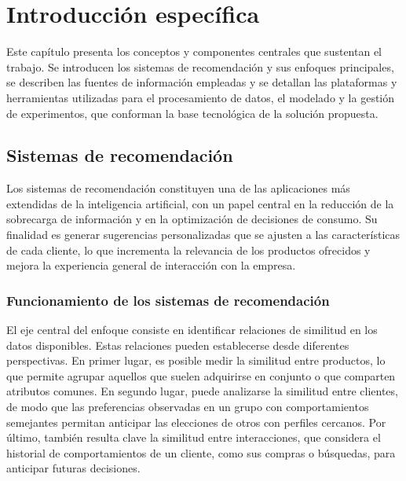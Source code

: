 \chapter{Introducción específica} 

\label{Chapter2}

Este capítulo presenta los conceptos y componentes centrales que sustentan el trabajo. Se introducen los sistemas de recomendación y sus enfoques principales, se describen las fuentes de información empleadas y se detallan las plataformas y herramientas utilizadas para el procesamiento de datos, el modelado y la gestión de experimentos, que conforman la base tecnológica de la solución propuesta.

\section{Sistemas de recomendación}

Los sistemas de recomendación constituyen una de las aplicaciones más extendidas de la inteligencia artificial, con un papel central en la reducción de la sobrecarga de información y en la optimización de decisiones de consumo. Su finalidad es generar sugerencias personalizadas que se ajusten a las características de cada cliente, lo que incrementa la relevancia de los productos ofrecidos y mejora la experiencia general de interacción con la empresa.

\subsection{Funcionamiento de los sistemas de recomendación}

El eje central del enfoque consiste en identificar relaciones de similitud en los datos disponibles. Estas relaciones pueden establecerse desde diferentes perspectivas. En primer lugar, es posible medir la similitud entre productos, lo que permite agrupar aquellos que suelen adquirirse en conjunto o que comparten atributos comunes. En segundo lugar, puede analizarse la similitud entre clientes, de modo que las preferencias observadas en un grupo con comportamientos semejantes permitan anticipar las elecciones de otros con perfiles cercanos. Por último, también resulta clave la similitud entre interacciones, que considera el historial de comportamientos de un cliente, como sus compras o búsquedas, para anticipar futuras decisiones.

